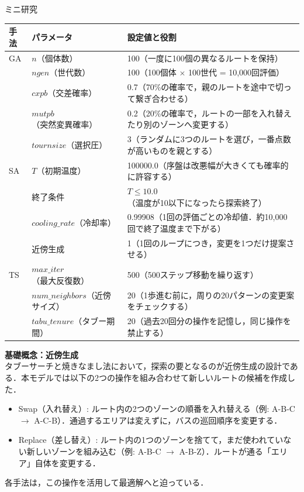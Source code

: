 \begin{column}{ミニ研究}
\begin{center}
  \label{tab:hyperparameters}
  \begin{tabular}{llp{7.5cm}}
    \toprule
    手法 & パラメータ & 設定値と役割 \\
    \midrule
    GA & $n$（個体数） & 100（一度に100個の異なるルートを保持） \\
       & $ngen$（世代数） & 100（100個体 $\times$ 100世代 = 10,000回評価） \\
       & $cxpb$（交差確率） & 0.7（70\%の確率で，親のルートを途中で切って繋ぎ合わせる） \\
       & $mutpb$（突然変異確率） & 0.2（20\%の確率で，ルートの一部を入れ替えたり別のゾーンへ変更する） \\
       & $tournsize$（選択圧） & 3（ランダムに3つのルートを選び，一番点数が高いものを親とする） \\
    \midrule
    SA & $T$（初期温度） & 100000.0（序盤は改悪幅が大きくても確率的に許容する） \\
       & 終了条件 & $T \leq 10.0$（温度が10以下になったら探索終了） \\
       & $cooling\_rate$（冷却率） & 0.99908（1回の評価ごとの冷却値．約10,000回で終了温度まで下がる） \\
       & 近傍生成 & 1（1回のループにつき，変更を1つだけ提案させる） \\
    \midrule
    TS & $max\_iter$（最大反復数） & 500（500ステップ移動を繰り返す） \\
       & $num\_neighbors$（近傍サイズ） & 20（1歩進む前に，周りの20パターンの変更案をチェックする） \\
       & $tabu\_tenure$（タブー期間） & 20（過去20回分の操作を記憶し，同じ操作を禁止する） \\
    \bottomrule
  \end{tabular}
\end{center}

\textbf{基礎概念：近傍生成}\\
タブーサーチと焼きなまし法において，探索の要となるのが近傍生成の設計である．本モデルでは以下の2つの操作を組み合わせて新しいルートの候補を作成した．
\begin{itemize}
    \item Swap（入れ替え）: ルート内の2つのゾーンの順番を入れ替える（例: A-B-C $\to$ A-C-B）．通過するエリアは変えずに，バスの巡回順序を変更する．
    \item Replace（差し替え）: ルート内の1つのゾーンを捨てて，まだ使われていない新しいゾーンを組み込む（例: A-B-C $\to$ A-B-Z）．ルートが通る「エリア」自体を変更する．
\end{itemize}
各手法は，この操作を活用して最適解へと迫っている．


\end{column}
